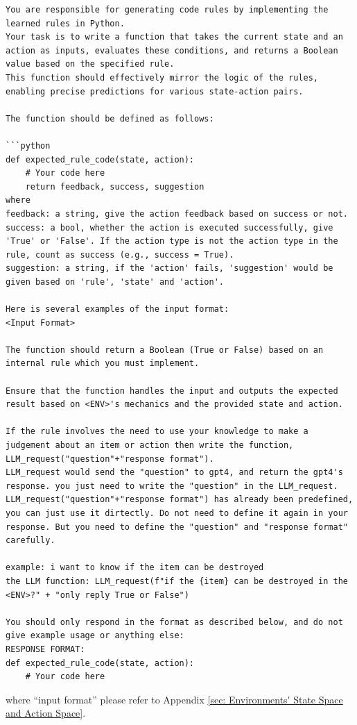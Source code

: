 \documentclass{article} %
\begin{document}
\lstset{language=}
\begin{lstlisting}
You are responsible for generating code rules by implementing the learned rules in Python. 
Your task is to write a function that takes the current state and an action as inputs, evaluates these conditions, and returns a Boolean value based on the specified rule. 
This function should effectively mirror the logic of the rules, enabling precise predictions for various state-action pairs.

The function should be defined as follows:

```python
def expected_rule_code(state, action):
    # Your code here
    return feedback, success, suggestion
where
feedback: a string, give the action feedback based on success or not.
success: a bool, whether the action is executed successfully, give 'True' or 'False'. If the action type is not the action type in the rule, count as success (e.g., success = True).
suggestion: a string, if the 'action' fails, 'suggestion' would be given based on 'rule', 'state' and 'action'.

Here is several examples of the input format:
<Input Format>

The function should return a Boolean (True or False) based on an internal rule which you must implement.

Ensure that the function handles the input and outputs the expected result based on <ENV>'s mechanics and the provided state and action.

If the rule involves the need to use your knowledge to make a judgement about an item or action then write the function, LLM_request("question"+"response format"). 
LLM_request would send the "question" to gpt4, and return the gpt4's response. you just need to write the "question" in the LLM_request. 
LLM_request("question"+"response format") has already been predefined, you can just use it dirtectly. Do not need to define it again in your response. But you need to define the "question" and "response format" carefully.

example: i want to know if the item can be destroyed
the LLM function: LLM_request(f"if the {item} can be destroyed in the <ENV>?" + "only reply True or False")

You should only respond in the format as described below, and do not give example usage or anything else:
RESPONSE FORMAT:
def expected_rule_code(state, action):
    # Your code here
\end{lstlisting}
where ``input format'' please refer to Appendix \ref{sec: Environments' State Space and Action Space}.
\end{document}
